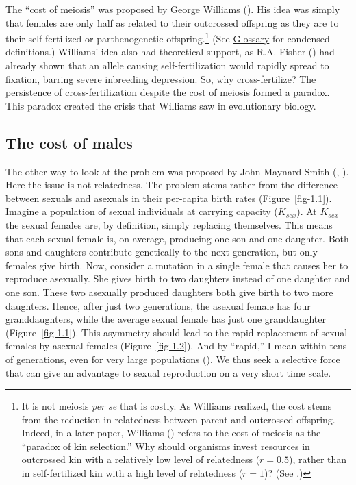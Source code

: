 \documentclass[
  american,
  letterpaper,
]{book}
\begin{document}
The ``cost of meiosis'' was proposed by George Williams
(). His idea was simply that females
are only half as related to their outcrossed offspring as they are to
their self-fertilized or parthenogenetic offspring.\footnote{It is not
  meiosis \emph{per se} that is costly. As Williams realized, the cost
  stems from the reduction in relatedness between parent and outcrossed
  offspring. Indeed, in a later paper, Williams
  () refers to the cost of meiosis as
  the ``paradox of kin selection.'' Why should organisms invest
  resources in outcrossed kin with a relatively low level of relatedness
  (\(r = 0.5\)), rather than in self-fertilized kin with a high level of
  relatedness (\(r = 1\))? (See .)}
(See \hyperref[sec-glossary]{Glossary} for condensed definitions.)
Williams' idea also had theoretical support, as R.A. Fisher
() had already shown that an allele
causing self-fertilization would rapidly spread to fixation, barring
severe inbreeding depression. So, why cross-fertilize? The persistence
of cross-fertilization despite the cost of meiosis formed a paradox.
This paradox created the crisis that Williams saw in evolutionary
biology.

\subsection{The cost of males}\label{the-cost-of-males}

The other way to look at the problem was proposed by John Maynard Smith
(, ).
Here the issue is not relatedness. The problem stems rather from the
difference between sexuals and asexuals in their per-capita birth rates
(Figure~\ref{fig-1.1}). Imagine a population of sexual individuals at
carrying capacity (\(K_{sex}\)). At \(K_{sex}\) the sexual females are,
by definition, simply replacing themselves. This means that each sexual
female is, on average, producing one son and one daughter. Both sons and
daughters contribute genetically to the next generation, but only
females give birth. Now, consider a mutation in a single female that
causes her to reproduce asexually. She gives birth to two daughters
instead of one daughter and one son. These two asexually produced
daughters both give birth to two more daughters. Hence, after just two
generations, the asexual female has four granddaughters, while the
average sexual female has just one granddaughter (Figure~\ref{fig-1.1}).
This asymmetry should lead to the rapid replacement of sexual females by
asexual females (Figure~\ref{fig-1.2}). And by ``rapid,'' I mean within
tens of generations, even for very large populations
(). We thus seek a selective
force that can give an advantage to sexual reproduction on a very short
time scale.
\end{document}
